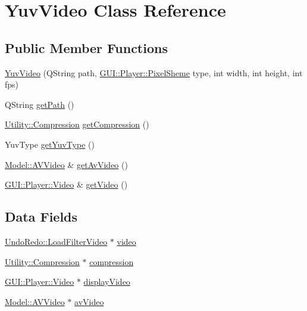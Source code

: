 \hypertarget{classModel_1_1YuvVideo}{}\section{Yuv\+Video Class Reference}
\label{classModel_1_1YuvVideo}
\subsection*{Public Member Functions}
\begin{DoxyCompactItemize}
\item 
\hyperlink{classModel_1_1YuvVideo_a8152242b4e284fd40e25986303f67473}{Yuv\+Video} (Q\+String path, \hyperlink{namespaceGUI_1_1Player_a52432774abcaf0c8c417ae77739fccfc}{G\+U\+I\+::\+Player\+::\+Pixel\+Sheme} type, int width, int height, int fps)
\item 
Q\+String \hyperlink{classModel_1_1YuvVideo_a1a94d0c9bf9dd725556721ac914025e3}{get\+Path} ()
\item 
\hyperlink{namespaceUtility_a56a83bf6847f4801f4205eb4be237ccf}{Utility\+::\+Compression} \hyperlink{classModel_1_1YuvVideo_a000ce702632feab3b3c87d4416f0b3d3}{get\+Compression} ()
\item 
Yuv\+Type \hyperlink{classModel_1_1YuvVideo_aded650e8b9796ea86dc24a9b75b3a8ec}{get\+Yuv\+Type} ()
\item 
\hyperlink{classModel_1_1AVVideo}{Model\+::\+A\+V\+Video} \& \hyperlink{classModel_1_1YuvVideo_a58bd43e5cbaa711bf19b0c71efbc9834}{get\+Av\+Video} ()
\item 
\hyperlink{classGUI_1_1Player_1_1Video}{G\+U\+I\+::\+Player\+::\+Video} \& \hyperlink{classModel_1_1YuvVideo_a56ebcfcff7dfad1f4b9e302794451afe}{get\+Video} ()
\end{DoxyCompactItemize}
\subsection*{Data Fields}
\begin{DoxyCompactItemize}
\item 
\hyperlink{classUndoRedo_1_1LoadFilterVideo}{Undo\+Redo\+::\+Load\+Filter\+Video} $\ast$ \hyperlink{classModel_1_1YuvVideo_a589afbbb98d9ac668ed4261722ddb780}{video}
\item 
\hyperlink{namespaceUtility_a56a83bf6847f4801f4205eb4be237ccf}{Utility\+::\+Compression} $\ast$ \hyperlink{classModel_1_1YuvVideo_a5d1e07bb289f0da24eb98307615fa3f5}{compression}
\item 
\hyperlink{classGUI_1_1Player_1_1Video}{G\+U\+I\+::\+Player\+::\+Video} $\ast$ \hyperlink{classModel_1_1YuvVideo_a17f257b55491782940deb4e086adecbb}{display\+Video}
\item 
\hyperlink{classModel_1_1AVVideo}{Model\+::\+A\+V\+Video} $\ast$ \hyperlink{classModel_1_1YuvVideo_a270efc836b2d2c70aec72106128ff89f}{av\+Video}
\end{DoxyCompactItemize}


